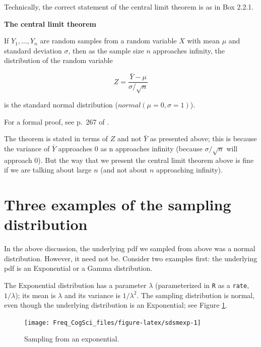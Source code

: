\documentclass[
  12pt,
]{krantz}
\theoremstyle{definition}
\theoremstyle{definition}
\theoremstyle{definition}
\theoremstyle{definition}
\theoremstyle{remark}
\begin{document}
Technically, the correct statement of the central limit theorem is as in Box 2.2.1.

\begin{mytheorem}

\textbf{The central limit theorem}

If \(Y_1,\dots, Y_n\) are random samples from a random variable \(X\) with mean \(\mu\) and standard deviation \(\sigma\), then as the sample size \(n\) approaches infinity, the distribution of the random variable

\begin{equation}
Z = \frac{\bar{Y}-\mu}{\sigma/\sqrt{n}}
\end{equation}

is the standard normal distribution (\(\mathit{normal}(\mu=0,\sigma=1)\)).

For a formal proof, see p.~267 of \citet{millermiller}.

\end{mytheorem}

The theorem is stated in terms of \(Z\) and not \(\bar{Y}\) as presented above; this is because the variance of \(\bar{Y}\) approaches 0 as n approaches infinity (because \(\sigma/\sqrt{n}\) will approach 0). But the way that we present the central limit theorem above is fine if we are talking about large \(n\) (and not about \(n\) approaching infinity).

\hypertarget{three-examples-of-the-sampling-distribution}{%
\section{Three examples of the sampling distribution}\label{three-examples-of-the-sampling-distribution}}

In the above discussion, the underlying pdf we sampled from above was a normal distribution. However, it need not be. Consider two examples first: the underlying pdf is an Exponential or a Gamma distribution.

The Exponential distribution has a parameter \(\lambda\) (parameterized in \texttt{R} as a \texttt{rate}, \(1/\lambda\)); its mean is \(\lambda\) and its variance is \(1/\lambda^2\). The sampling distribution is normal, even though the underlying distribution is an Exponential; see Figure \ref{fig:sdsmexp}.

\begin{figure}
\texttt{[image: Freq\_CogSci\_files/figure-latex/sdsmexp-1]} \caption{Sampling from an exponential.}\label{fig:sdsmexp}
\end{figure}
\end{document}
